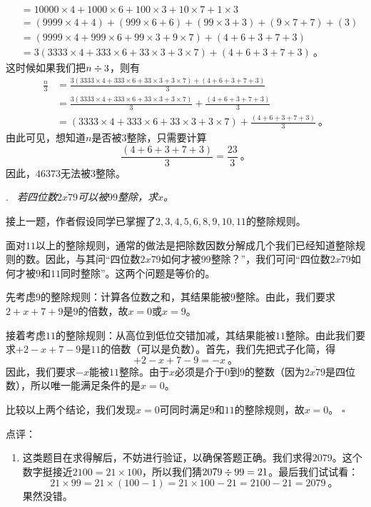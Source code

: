 \documentclass[a4,12pt]{article}
\newcounter{Problem}
\newcommand{\Problem}[2]{
		\vspace*{10pt}
		\label{Problem #1}
		\noindent#1.\emph{~#2}
	}
\newcommand{\Qed}{\hfill\ensuremath{\square}}
\begin{document}
\begin{enumerate}[label=(\alph*)]
\[\begin{aligned}
					&= 10000\times4 + 1000\times6 + 100\times3 + 10\times7 + 1\times3 \\
					&= (9999\times4 + 4) + (999\times6 + 6) + (99\times3 + 3) + (9\times7 + 7) + (3) \\
					&= (9999\times4 + 999\times6 + 99\times3 + 9\times7) + (4 + 6 + 3 + 7 + 3) \\
					&= 3(3333\times4 + 333\times6 + 33\times3 + 3\times7) + (4+6+3+7+3) \ \mbox{。}
				\end{aligned}
			\]
			这时候如果我们把$n\divisionsymbol3$，则有
			\[ \begin{aligned}
					\frac{n}{3}
					&= \frac{3(3333\times4 + 333\times6 + 33\times3 + 3\times7) + (4+6+3+7+3)}{3} \\
					&= \frac{3(3333\times4 + 333\times6 + 33\times3 + 3\times7)}{3} + \frac{(4+6+3+7+3)}{3} \\
					&= (3333\times4 + 333\times6 + 33\times3 + 3\times7) + \frac{(4+6+3+7+3)}{3} \ \mbox{。}
				\end{aligned}
			\]
			由此可见，想知道$n$是否被$3$整除，只需要计算
			\[ \frac{(4+6+3+7+3)}{3} = \frac{23}{3} \ \mbox{。} \]
			因此，$46373$无法被$3$整除。
	\end{enumerate}

\pagebreak
\Problem{3}{
	若四位数$\overline{2x79}$可以被$99$整除，求$x$。
	}

	接上一题，作者假设同学已掌握了$2, 3, 4, 5, 6, 8, 9, 10, 11$的整除规则。

	面对$11$以上的整除规则，通常的做法是把除数因数分解成几个我们已经知道整除规则的数。因此，与其问“四位数$\overline{2x79}$如何才被$99$整除？”，我们可问“四位数$\overline{2x79}$如何才被$9$和$11$同时整除”。这两个问题是等价的。

	先考虑$9$的整除规则：计算各位数之和，其结果能被$9$整除。由此，我们要求$2+x+7+9$是$9$的倍数，故$x=0$或$x=9$。

	接着考虑$11$的整除规则：从高位到低位交错加减，其结果能被$11$整除。由此我们要求$+2-x+7-9$是$11$的倍数（可以是负数）。首先，我们先把式子化简，得
	\[ +2-x+7-9 = -x \ \mbox{。} \]
	因此，我们要求$-x$能被$11$整除。由于$x$必须是介于$0$到$9$的整数（因为$\overline{2x79}$是四位数），所以唯一能满足条件的是$x=0$。

	比较以上两个结论，我们发现$x=0$可同时满足$9$和$11$的整除规则，故$x=0$。
	\Qed
	\vspace*{30pt}

	\noindent 点评：
	\begin{enumerate}[label=(\alph*)]
		\item 这类题目在求得解后，不妨进行验证，以确保答题正确。我们求得$2079$。这个数字挺接近$2100 = 21\times100$，所以我们猜$2079\divisionsymbol99=21$。最后我们试试看：
			\[ 21\times99 = 21\times(100 - 1) = 21\times100 - 21 = 2100 - 21 = 2079 \ \mbox{。} \]
			果然没错。
	\end{enumerate}
\end{document}
